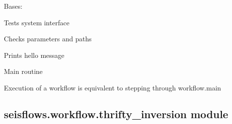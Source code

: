 \documentclass[letterpaper,10pt,english]{sphinxmanual}
\begin{document}
\begin{fulllineitems}
\label{\detokenize{ref/seisflows.workflow:seisflows.workflow.test_system.test_system}}
Bases: {\hyperref[\detokenize{ref/seisflows.workflow:seisflows.workflow.base.base}]{}}

Tests system interface

\begin{fulllineitems}
\label{\detokenize{ref/seisflows.workflow:seisflows.workflow.test_system.test_system.check}}
Checks parameters and paths

\end{fulllineitems}


\begin{fulllineitems}
\label{\detokenize{ref/seisflows.workflow:seisflows.workflow.test_system.test_system.hello}}
Prints hello message

\end{fulllineitems}


\begin{fulllineitems}
\label{\detokenize{ref/seisflows.workflow:seisflows.workflow.test_system.test_system.main}}
Main routine

Execution of a workflow is equivalent to stepping through
workflow.main

\end{fulllineitems}


\end{fulllineitems}



\subsection{seisflows.workflow.thrifty\_inversion module}
\label{\detokenize{ref/seisflows.workflow:module-seisflows.workflow.thrifty_inversion}}\label{\detokenize{ref/seisflows.workflow:seisflows-workflow-thrifty-inversion-module}}
\end{document}
